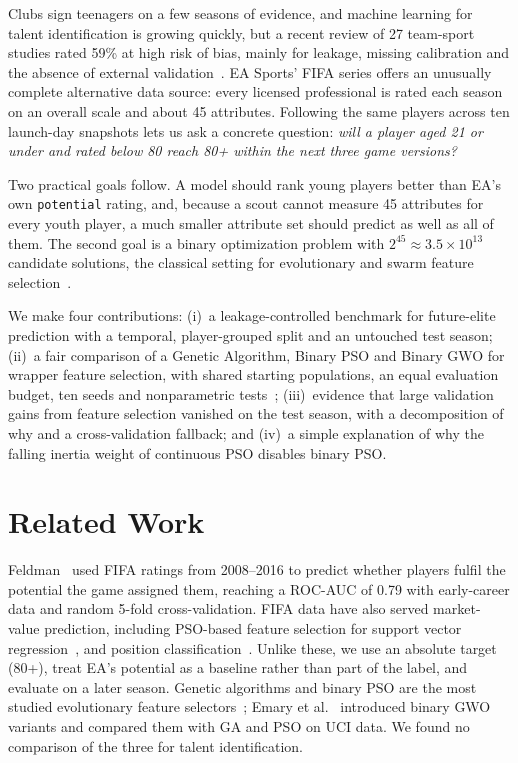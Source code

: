 \documentclass[runningheads]{llncs}
\begin{document}
Clubs sign teenagers on a few seasons of evidence, and machine learning for talent identification is growing quickly, but a recent review of 27 team-sport studies rated 59\% at high risk of bias, mainly for leakage, missing calibration and the absence of external validation~\cite{tang2026review}. EA Sports' FIFA series offers an unusually complete alternative data source: every licensed professional is rated each season on an overall scale and about 45 attributes. Following the same players across ten launch-day snapshots lets us ask a concrete question: \emph{will a player aged 21 or under and rated below 80 reach 80+ within the next three game versions?}

Two practical goals follow. A model should rank young players better than EA's own \texttt{potential} rating, and, because a scout cannot measure 45 attributes for every youth player, a much smaller attribute set should predict as well as all of them. The second goal is a binary optimization problem with $2^{45} \approx 3.5 \times 10^{13}$ candidate solutions, the classical setting for evolutionary and swarm feature selection~\cite{xue2016survey}.

We make four contributions: (i)~a leakage-controlled benchmark for future-elite prediction with a temporal, player-grouped split and an untouched test season; (ii)~a fair comparison of a Genetic Algorithm, Binary PSO and Binary GWO for wrapper feature selection, with shared starting populations, an equal evaluation budget, ten seeds and nonparametric tests~\cite{derrac2011tutorial}; (iii)~evidence that large validation gains from feature selection vanished on the test season, with a decomposition of why and a cross-validation fallback; and (iv)~a simple explanation of why the falling inertia weight of continuous PSO disables binary PSO.

\section{Related Work}

Feldman~\cite{feldman2025predict} used FIFA ratings from 2008--2016 to predict whether players fulfil the potential the game assigned them, reaching a ROC-AUC of 0.79 with early-career data and random 5-fold cross-validation. FIFA data have also served market-value prediction, including PSO-based feature selection for support vector regression~\cite{behravan2021value}, and position classification~\cite{alasadi2021fifa}. Unlike these, we use an absolute target (80+), treat EA's potential as a baseline rather than part of the label, and evaluate on a later season. Genetic algorithms and binary PSO are the most studied evolutionary feature selectors~\cite{xue2016survey}; Emary et al.~\cite{emary2016bgwo} introduced binary GWO variants and compared them with GA and PSO on UCI data. We found no comparison of the three for talent identification.
\end{document}
